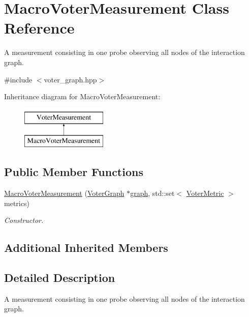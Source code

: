 \hypertarget{class_macro_voter_measurement}{}\section{Macro\+Voter\+Measurement Class Reference}
\label{class_macro_voter_measurement}


A measurement consisting in one probe observing all nodes of the interaction graph.  




{\ttfamily \#include $<$voter\+\_\+graph.\+hpp$>$}

Inheritance diagram for Macro\+Voter\+Measurement\+:\begin{figure}[H]
\begin{center}
\leavevmode
\includegraphics[height=2.000000cm]{class_macro_voter_measurement}
\end{center}
\end{figure}
\subsection*{Public Member Functions}
\begin{DoxyCompactItemize}
\item 
\hyperlink{class_macro_voter_measurement_a5198644e81ae6561fd8d53e3a944328d}{Macro\+Voter\+Measurement} (\hyperlink{class_voter_graph}{Voter\+Graph} $\ast$\hyperlink{class_voter_measurement_a8d22d4b78f7e2f4c747f5716c4885351}{graph}, std\+::set$<$ \hyperlink{voter__graph_8hpp_acb4c45a5ce4a55eee28e54e60409b9c5}{Voter\+Metric} $>$ metrics)
\begin{DoxyCompactList}\small\item\em Constructor. \end{DoxyCompactList}\end{DoxyCompactItemize}
\subsection*{Additional Inherited Members}


\subsection{Detailed Description}
A measurement consisting in one probe observing all nodes of the interaction graph. 

